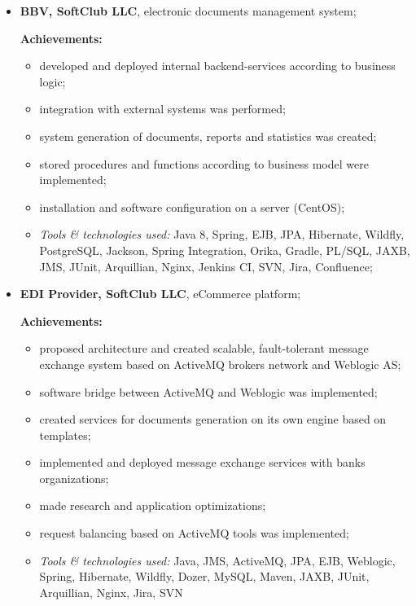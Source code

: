 \documentclass[a4paper, 12pt]{article}
\newcommand{\position}[1]{
    \textbf{#1}}
\newcommand{\itemlabel}[1]{
    \textit{#1:}}
\begin{document}
    \begin{itemize}
        \item \position{BBV, SoftClub LLC}, electronic documents management system;

            \textbf{Achievements:}
			\begin{itemize}
  				\item developed and deployed internal backend-services according to business logic;
  				\item integration with external systems was performed;
				\item system generation of documents, reports and statistics was created;
  				\item stored procedures and functions according to business model were implemented;
  				\item installation and software configuration on a server (CentOS);
			\end{itemize}
	
            \begin{itemize}
                \item \itemlabel{Tools \& technologies used} Java 8, Spring, EJB, JPA, Hibernate, Wildfly, PostgreSQL, Jackson, Spring Integration, Orika,  Gradle, PL/SQL, JAXB, JMS, JUnit, Arquillian, Nginx, Jenkins CI, SVN, Jira, Confluence;
            \end{itemize}
    \end{itemize}

        \begin{itemize}
        \item \position{EDI Provider, SoftClub LLC}, eCommerce platform;

            \textbf{Achievements:}
			\begin{itemize}
  				\item proposed architecture and created scalable, fault-tolerant message exchange system based on ActiveMQ brokers network and Weblogic AS;
  				\item software bridge between ActiveMQ and Weblogic was implemented;
  				\item created services for documents generation on its own engine based on templates; 
				\item implemented and deployed message exchange services with banks organizations;
  				\item made research and application optimizations;
  				\item request balancing based on ActiveMQ tools was implemented;
			\end{itemize}
	
            \begin{itemize}
                \item \itemlabel{Tools \& technologies used} Java, JMS, ActiveMQ, JPA, EJB, Weblogic, Spring, Hibernate, Wildfly, Dozer, MySQL, Maven, JAXB, JUnit, Arquillian, Nginx, Jira, SVN
            \end{itemize}
    \end{itemize}
    
\end{document}
